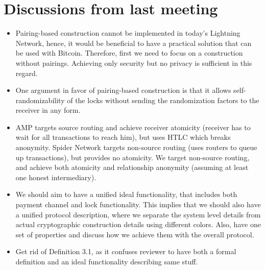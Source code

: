 \section{Discussions from last meeting}

\begin{itemize}
	\item Pairing-based construction cannot be implemented in today's Lightning Network, hence, it would be beneficial to have a practical solution that can be used with Bitcoin. Therefore, first we need to focus on a construction without pairings. Achieving only security but no privacy is sufficient in this regard.
	\item One argument in favor of pairing-based construction is that it allows self-randomizability of the locks without sending the randomization factors to the receiver in any form.
	\item AMP targets source routing and achieve receiver atomicity (receiver has to wait for all transactions to reach him), but uses HTLC which breaks anonymity. Spider Network targets non-source routing (uses routers to queue up transactions), but provides no atomicity. We target non-source routing, and achieve both atomicity and relationship anonymity (assuming at least one honest intermediary).
	\item We should aim to have a unified ideal functionality, that includes both payment channel  and lock functionality. This implies that we should also have a unified protocol description, where we separate the system level details from actual cryptographic construction details using different colors. Also, have one set of properties and discuss how we achieve them with the overall protocol.
	\item Get rid of Definition 3.1, as it confuses reviewer to have both a formal definition and an ideal functionality describing same stuff.
\end{itemize}